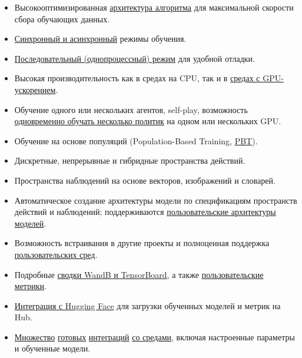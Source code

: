 \documentclass[11pt,a4paper]{article}
\begin{document}
\begin{itemize}
\tightlist
\item
  Высокооптимизированная \href{https://www.samplefactory.dev/06-architecture/overview/}{архитектура алгоритма} для максимальной скорости сбора обучающих данных.
\item
  \href{https://www.samplefactory.dev/07-advanced-topics/sync-async/}{Синхронный и асинхронный} режимы обучения.
\item
  \href{https://www.samplefactory.dev/07-advanced-topics/serial-mode/}{Последовательный (однопроцессный) режим} для удобной отладки.
\item
  Высокая производительность как в средах на CPU, так и в \href{https://www.samplefactory.dev/09-environment-integrations/isaacgym/}{средах с GPU-ускорением}.
\item
  Обучение одного или нескольких агентов, self-play, возможность \href{https://www.samplefactory.dev/07-advanced-topics/multi-policy-training/}{одновременно обучать несколько политик} на одном или нескольких GPU.
\item
  Обучение на основе популяций (Population-Based Training, \href{https://www.samplefactory.dev/07-advanced-topics/pbt/}{PBT}).
\item
  Дискретные, непрерывные и гибридные пространства действий.
\item
  Пространства наблюдений на основе векторов, изображений и словарей.
\item
  Автоматическое создание архитектуры модели по спецификациям пространств действий и наблюдений; поддерживаются \href{https://www.samplefactory.dev/03-customization/custom-models/}{пользовательские архитектуры моделей}.
\item
  Возможность встраивания в другие проекты и полноценная поддержка \href{https://www.samplefactory.dev/03-customization/custom-environments/}{пользовательских сред}.
\item
  Подробные \href{https://www.samplefactory.dev/05-monitoring/metrics-reference/}{сводки WandB и TensorBoard}, а также \href{https://www.samplefactory.dev/05-monitoring/custom-metrics/}{пользовательские метрики}.
\item
  \href{https://www.samplefactory.dev/10-huggingface/huggingface/}{Интеграция с Hugging Face} для загрузки обученных моделей и метрик на Hub.
\item
  \href{https://www.samplefactory.dev/09-environment-integrations/mujoco/}{Множество} \href{https://www.samplefactory.dev/09-environment-integrations/atari/}{готовых} \href{https://www.samplefactory.dev/09-environment-integrations/vizdoom/}{интеграций} \href{https://www.samplefactory.dev/09-environment-integrations/dmlab/}{со средами}, включая настроенные параметры и обученные модели.
\end{itemize}
\end{document}
